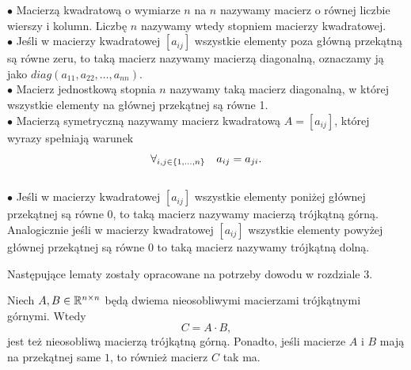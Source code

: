 \documentclass[12pt,a4paper]{report}
\newcommand{\mx}[1]{{#1}}
\begin{document}
\begin{definition} \label{definicja-macierzy}
$\bullet$ Macierzą kwadratową o wymiarze $n$ na $n$ nazywamy macierz o równej liczbie wierszy i kolumn. Liczbę $n$ nazywamy wtedy stopniem macierzy kwadratowej. \\
$\bullet$ Jeśli w macierzy kwadratowej $[a_{ij}]$ wszystkie elementy poza główną przekątną są równe zeru, to taką macierz nazywamy macierzą diagonalną, oznaczamy ją jako $diag(a_{11}, a_{22},\ldots,a_{nn})$. \\
$\bullet$ Macierz jednostkową stopnia $n$ nazywamy taką macierz diagonalną, w której wszystkie elementy na głównej przekątnej są równe 1. \\
$\bullet$ Macierzą symetryczną nazywamy macierz kwadratową $\mx{A}=[a_{ij}]$, której wyrazy spełniają warunek 
$$
\forall_{i,j \in \left\lbrace {1,\ldots,n} \right\rbrace} \quad a_{ij}=a_{ji}.
$$ \\
$\bullet$ Jeśli w macierzy kwadratowej $[a_{ij}]$ wszystkie elementy poniżej głównej przekątnej są równe $0$, to taką macierz nazywamy macierzą trójkątną górną.
Analogicznie jeśli w macierzy kwadratowej $[a_{ij}]$ wszystkie elementy powyżej głównej przekątnej są równe $0$ to taką macierz nazywamy trójkątną dolną.

\end{definition}
Następujące lematy zostały opracowane na potrzeby dowodu w rozdziale 3.
\begin{lemma} \label{lemma-upper-triangle-multiplication}
Niech $\mx{A}, \mx{B} \in \setR^{n \times n}$ będą dwiema nieosobliwymi macierzami trójkątnymi górnymi. Wtedy
$$
\mx{C} = \mx{A} \cdot \mx{B},
$$
jest też nieosobliwą macierzą trójkątną górną. Ponadto, jeśli macierze $\mx{A}$ i $\mx{B}$ mają na przekątnej same $1$, to również macierz $\mx{C}$ tak ma.
\end{lemma}
\end{document}
